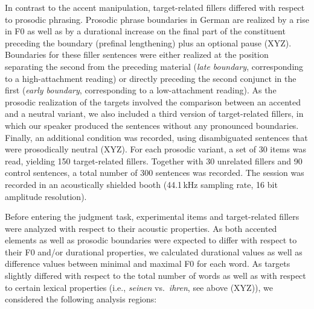 \documentclass[fleqn,reqno,10pt,draft]{article}
\begin{document}
In contrast to the accent manipulation, target-related fillers
differed with respect to prosodic phrasing. Prosodic phrase boundaries
in German are realized by a rise in F0 as well as by a durational
increase on the final part of the constituent preceding the boundary
(prefinal lengthening) plus an optional pause (XYZ). Boundaries for these filler sentences
were either realized at the position separating the second 
from the preceding material (\emph{late boundary}, corresponding to a
high-attachment reading) or directly preceding the second conjunct in
the first  (\emph{early boundary}, corresponding to a
low-attachment reading). As the prosodic realization of the targets
involved the comparison between an accented and a neutral variant, we
also included a third version of target-related fillers, in which our
speaker produced the sentences without any pronounced
boundaries. Finally, an additional condition was recorded, using
disambiguated sentences that were prosodically neutral (XYZ). For each prosodic variant, a set of
30 items was read, yielding 150 target-related fillers. Together with
30 unrelated fillers and 90 control sentences, a total number of 300
sentences was recorded. The session was recorded in an acoustically
shielded booth (44.1\,kHz sampling rate, 16 bit amplitude resolution).

Before entering the judgment task, experimental items and
target-related fillers were analyzed with respect to their acoustic
properties. As both accented elements as well as prosodic boundaries
were expected to differ with respect to their F0 and/or durational
properties, we calculated durational values as well as difference
values between minimal and maximal F0 for each word. As targets
slightly differed with respect to the total number of words as well as
with respect to certain lexical properties (i.e., \emph{seinen}
vs.~\emph{ihren}, see above (XYZ)), we considered
the following analysis regions:
\end{document}
